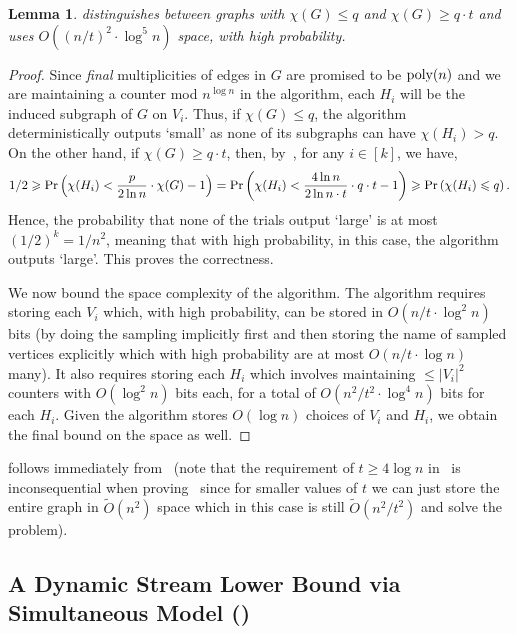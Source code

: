 \documentclass[11pt]{article}
\newtheorem{lemma}{Lemma}[section]
\theoremstyle{definition}
\renewcommand{\leq}{\leqslant}
\renewcommand{\geq}{\geqslant}
\newcommand{\Ot}{\ensuremath{\widetilde{O}}}
\newcommand{\paren}[1]{\ensuremath{\left(#1\right)}\xspace}
\newcommand{\card}[1]{\left\vert{#1}\right\vert}
\newcommand{\poly}{\mbox{\rm poly}}
\DeclareMathOperator*{\Prob}{\ensuremath{\textnormal{Pr}}}
\renewcommand{\Pr}{\Prob}
\begin{document}
\begin{lemma}\label{lem:dynamic-correct}
	 distinguishes between graphs with $\chi(G) \leq q$ and $\chi(G) \geq q \cdot t$ and uses $O((n/t)^2 \cdot \log^5{n})$ space, with high probability.  
\end{lemma}
\begin{proof}
	Since \emph{final} multiplicities of edges in $G$ are promised to be $\poly(n)$ and we are maintaining a counter mod $n^{\log{n}}$ in the algorithm, each $H_i$ will be 
	the induced subgraph of $G$ on $V_i$. Thus, if $\chi(G) \leq q$, the algorithm deterministically outputs `small' as none of its subgraphs can have $\chi(H_i) > q$. 
	On the other hand, if $\chi(G) \geq q \cdot t$, then, by~, for any $i \in [k]$, we have, 
	\[
		1/2 \geq \Pr\paren{\chi(H_i) < \frac{p}{2\ln{n}} \cdot \chi(G) -1} = \Pr\paren{\chi(H_i) < \frac{4\ln{n}}{2\ln{n} \cdot t} \cdot q \cdot t -1} \geq \Pr\paren{\chi(H_i) \leq q}. 
	\]
	Hence, the probability that none of the trials output `large' is at most $(1/2)^k = 1/n^2$, meaning that with high probability, in this case, the algorithm outputs `large'. This proves the correctness. 
	
	We now bound the space complexity of the algorithm. The algorithm requires storing each $V_i$ which, with high probability, can be stored in $O(n/t \cdot \log^2{n})$ bits (by doing the sampling implicitly first and then storing the name of sampled vertices explicitly which with high probability are at most $O(n/t \cdot \log{n})$ many). It also requires storing each $H_i$ which involves maintaining $\leq \card{V_i}^2$ counters with $O(\log^2{n})$ bits each, for a total of $O(n^2/t^2 \cdot \log^4{n})$ bits for each $H_i$. Given the algorithm stores $O(\log{n})$ choices of $V_i$ and $H_i$, 
	we obtain the final bound on the space as well. 
\end{proof}

 follows immediately from~ (note that the requirement of $t \geq 4\log{n}$ in~ is inconsequential when proving~ since for smaller
values of $t$ we can just store the entire graph in $\Ot(n^2)$ space which in this case is still $\Ot(n^2/t^2)$ and solve the problem). 

\subsection{A Dynamic Stream Lower Bound via Simultaneous Model ()}
\end{document}
